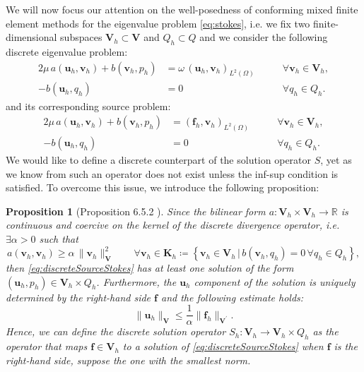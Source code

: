 \documentclass[USenglish]{article}
\theoremstyle{dgthm}
\newtheorem{proposition}{Proposition}
\theoremstyle{dgdef}
\let\vec\bm
\newcommand\norm[1]{\lVert#1\rVert}
\begin{document}
We will now focus our attention on the well-posedness of conforming mixed finite element methods for the eigenvalue problem \eqref{eq:stokes}, i.e. we fix two finite-dimensional subspaces $\vec{V}_h\subset \vec{V}$ and $Q_h\subset Q$ and we consider the following discrete eigenvalue problem:
\begin{equation}
  \label{eq:discreteStokes}
  \begin{aligned}
    2\mu\, a(\vec{u}_h,\vec{v}_h) + b(\vec{v}_h,p_h)&=\omega\, (\vec{u}_h,\vec{v}_h)_{L^2(\Omega)} \qquad &\forall \vec{v}_h\in \vec{V}_h,\\
    -b(\vec{u}_h,q_h)&=0 \qquad &\forall q_h\in Q_h.
  \end{aligned}
\end{equation}
and its corresponding source problem:
\begin{equation}
  \label{eq:discreteSourceStokes}
  \begin{aligned}
    2\mu\, a(\vec{u}_h,\vec{v}_h) + b(\vec{v}_h,p_h)&=(\vec{f}_h,\vec{v}_h)_{L^2(\Omega)} \qquad &\forall \vec{v}_h\in \vec{V}_h,\\
    -b(\vec{u}_h,q_h)&=0 \qquad &\forall q_h\in Q_h.
  \end{aligned}
\end{equation}
We would like to define a discrete counterpart of the solution operator $S$, yet as we know from \cite{Brezzi} such an operator does not exist unless the inf-sup condition is satisfied.
To overcome this issue, we introduce the following proposition:
\begin{proposition}[Proposition 6.5.2 \cite{BBF}]
  Since the bilinear form $a:\vec{V}_h\times \vec{V}_h\to \mathbb{R}$ is continuous and coercive on the kernel of the discrete divergence operator, i.e.~$\exists \alpha>0$ such that
  \begin{equation}
    a(\vec{v}_h,\vec{v}_h)\geq \alpha\, \norm{\vec{v}_h}^2_{\vec{V}} \qquad \forall \vec{v}_h\in \vec{K}_h\coloneqq \left\{\vec{v}_h\in \vec{V}_h\,|\, b(\vec{v}_h,q_h)=0\, \forall q_h\in Q_h\right\},
  \end{equation}
  then \eqref{eq:discreteSourceStokes} has at least one solution of the form $(\vec{u}_h,p_h)\in \vec{V}_h\times Q_h$. Furthermore, the $\vec{u}_h$ component of the solution is uniquely determined by the right-hand side $\vec{f}$ and the following estimate holds:
  \begin{equation}
    \norm{\vec{u}_h}_{\vec{V}}\leq \frac{1}{\alpha}\norm{\vec{f}_h}_{\vec{V}^\prime}.
  \end{equation}
  Hence, we can define the discrete solution operator $S_h:\vec{V}_h\to \vec{V}_h\times Q_h$ as the operator that maps $\vec{f}\in \vec{V}_h$ to a solution of \eqref{eq:discreteSourceStokes} when $\vec{f}$ is the right-hand side, suppose the one with the smallest norm.
\end{proposition}
\end{document}
